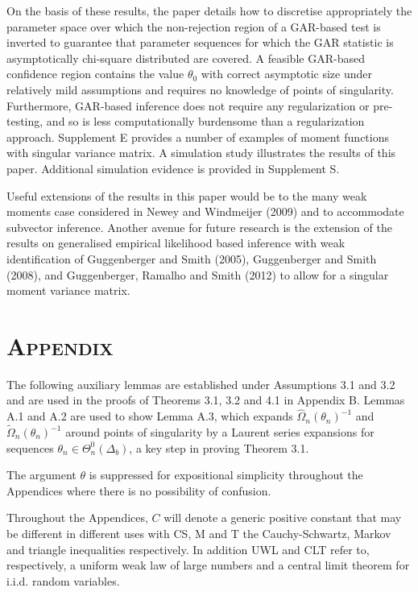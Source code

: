 \documentclass[hidelinks, 11 pt, a4paper, pdflatex]{article}
\begin{document}
{  On the basis of these results, the paper details how to discretise appropriately the parameter space over which the non-rejection region of a GAR-based test is inverted to guarantee that parameter sequences for which the GAR statistic is asymptotically chi-square distributed are covered. A feasible GAR-based confidence region contains the value $\theta_0$ with correct asymptotic size under relatively mild assumptions and requires no knowledge of points of singularity. Furthermore, GAR-based inference does not require any regularization or pre-testing, and so is less computationally burdensome than a regularization approach. Supplement E provides a number of examples of moment functions with singular variance matrix. A simulation study illustrates the results of this paper. Additional simulation evidence is provided in Supplement S.

  Useful extensions of the results in this paper would be to the many weak moments case considered in Newey and Windmeijer (2009) and to accommodate subvector inference. Another avenue for future research is the extension of the results on generalised empirical likelihood based inference with weak identification of Guggenberger and Smith (2005),  Guggenberger and Smith (2008), and Guggenberger, Ramalho and Smith (2012) to allow for a singular moment variance matrix.



 \renewcommand{\thesection}{}

 \section{\textsc{Appendix}}

  The following auxiliary lemmas are established under Assumptions 3.1 and 3.2 and are used in the proofs of Theorems 3.1, 3.2 and 4.1 in Appendix B. Lemmas A.1 and A.2 are used to show Lemma A.3, which expands $\hat{\Omega}_n(\theta_n)^{-1}$ and  $\tilde{\Omega}_n(\theta_n)^{-1}$ around points of singularity by a Laurent series expansions for sequences $\theta_n \in \Theta_n^{0}(\Delta_b)$, a key step in proving Theorem 3.1.

  The argument $\theta$ is suppressed for expositional simplicity throughout the Appendices where there is no possibility of confusion.

  Throughout the Appendices, $C$ will denote a generic positive constant that may be different in different uses with CS, M and T the Cauchy-Schwartz, Markov and triangle inequalities respectively. In addition UWL and CLT refer to, respectively, a uniform weak law of large numbers and a central limit theorem for i.i.d. random variables.

}
\end{document}
